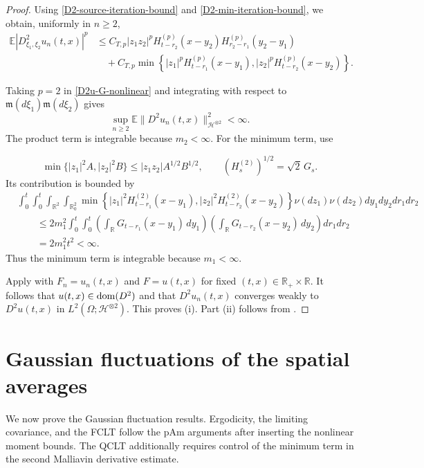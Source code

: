 \documentclass[12pt]{article}
\def\cH{\mathcal{H}}
\def\bE{\mathbb{E}}
\def\bR{\mathbb{R}}
\newcommand{\fm}{\mathfrak{m}}
\begin{document}
\begin{proof}
Using \eqref{D2-source-iteration-bound} and
\eqref{D2-min-iteration-bound}, we obtain, uniformly in $n\ge2$,
\begin{align}
\label{D2u-G-nonlinear}
\bE\left|D^2_{\xi_1,\xi_2}u_n(t,x)\right|^p
&\le
C_{T,p}|z_1z_2|^p
H_{t-r_2}^{(p)}(x-y_2)
H_{r_2-r_1}^{(p)}(y_2-y_1)
\nonumber\\
&\quad+
C_{T,p}
\min\left\{
|z_1|^pH_{t-r_1}^{(p)}(x-y_1),
|z_2|^pH_{t-r_2}^{(p)}(x-y_2)
\right\}.
\end{align}



Taking $p=2$ in \eqref{D2u-G-nonlinear} and integrating with respect to
$\fm(d\xi_1)\fm(d\xi_2)$ gives
\[
\sup_{n\ge2}
\bE\|D^2u_n(t,x)\|_{\cH^{\otimes2}}^2<\infty.
\]
The product term is integrable because $m_2<\infty$. For the minimum
term, use

\[
\min\{|z_1|^2A,|z_2|^2B\}\le |z_1z_2|A^{1/2}B^{1/2},
\qquad (H_s^{(2)})^{1/2}=\sqrt2\,G_s.
\]
Its contribution is bounded by
\[
\begin{aligned}
&\int_0^t\int_0^t\int_{\bR^2}\int_{\bR_0^2}
\min\left\{|z_1|^2H_{t-r_1}^{(2)}(x-y_1),
|z_2|^2H_{t-r_2}^{(2)}(x-y_2)\right\}
\nu(dz_1)\nu(dz_2)dy_1dy_2dr_1dr_2 \\
&\qquad\le
2m_1^2
\int_0^t\int_0^t
\left(\int_{\bR}G_{t-r_1}(x-y_1)\,dy_1\right)
\left(\int_{\bR}G_{t-r_2}(x-y_2)\,dy_2\right)
dr_1dr_2  \\
&\qquad=
2m_1^2t^2
<\infty .
\end{aligned}
\]
 Thus the minimum term is integrable because $m_1<\infty$.





\medskip
Apply \cite[Lemma~2.1]{BLW26} with $F_n=u_n(t,x)$ and $F=u(t,x)$
for fixed $(t,x)\in\bR_+\times\bR$. It follows that
$u(t,x)\in{\rm dom}(D^2)$ and that $D^2u_n(t,x)$ converges weakly to
$D^2u(t,x)$ in $L^2(\Omega;\cH^{\otimes2})$. This proves (i). Part (ii)
follows from \cite[Lemma~A.1]{BS26}.
\end{proof}


\section{Gaussian fluctuations of the spatial averages}
\label{sec:Gaussian-fluctuations}

We now prove the Gaussian fluctuation results. Ergodicity, the limiting
covariance, and the FCLT follow the pAm arguments after inserting the nonlinear
moment bounds. The QCLT additionally requires control of the minimum term in
the second Malliavin derivative estimate.
\end{document}
